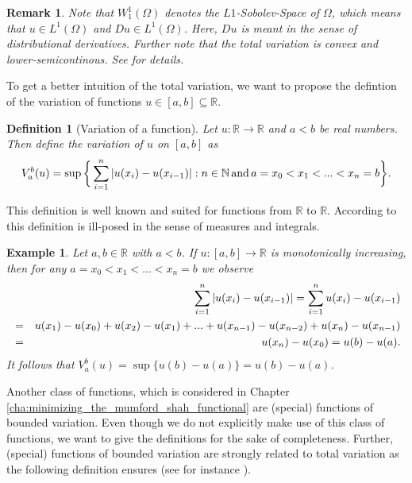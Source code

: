 \documentclass[abstracton]{scrreprt}
\newtheorem{definition}[theorem]{Definition}
\newtheorem{example}[theorem]{Example}
\newtheorem{remark}[theorem]{Remark}
\begin{document}
        \begin{remark}
            Note that $W_{1}^{1}(\Omega)$ denotes the $L1$-Sobolev-Space of $\Omega$, which means that $u \in L^{1}(\Omega)$ and $Du \in L^{1}(\Omega)$. Here, $Du$ is meant in the sense of distributional derivatives. Further note that the total variation is convex and lower-semicontinous. See \cite{Chambolle-et-al-10} for details.
        \end{remark}
        To get a better intuition of the total variation, we want to propose the defintion of the variation of functions $u \in [a, b] \subseteq \mathbb{R}$.
        \begin{definition}[Variation of a function] %
        \label{def:variation_of_a_function}
            Let $u: \mathbb{R} \longrightarrow \mathbb{R}$ and $a < b$ be real numbers. Then define the variation of $u$ on $[a, b]$ as
                $$
                    V^{b}_{a}(u) = \sup \bigg\{ \sum_{i = 1}^{n} |u(x_{i}) - u(x_{i - 1})| : n \in \mathbb{N} \,\textnormal{and}\, a = x_{0} < x_{1} < ... < x_{n} = b \bigg\}.
                $$
        \end{definition}
        This definition is well known and suited for functions from $\mathbb{R}$ to $\mathbb{R}$. According to \cite{Giusti} this definition is ill-posed in the sense of measures and integrals.
        \begin{example} %
        \label{ex:total_variation_one_d}
            Let $a, b \in \mathbb{R}$ with $a < b$. If $u: [a, b] \longrightarrow \mathbb{R}$ is monotonically increasing, then for any $a = x_{0} < x_{1} < ... < x_{n} = b$ we observe
                \begin{eqnarray}
                    &&\sum_{i = 1}^{n} |u(x_{i}) - u(x_{i-1})| = \sum_{i = 1}^{n} u(x_{i}) - u(x_{i-1}) \notag \\
                    &=& u(x_{1}) - u(x_{0}) + u(x_{2}) - u(x_{1}) + ... + u(x_{n-1}) - u(x_{n-2}) + u(x_{n}) - u(x_{n-1}) \notag \\
                    &=& u(x_{n}) - u(x_{0}) = u(b) - u(a). \notag
                \end{eqnarray}
            It follows that $V^{b}_{a}(u) = \sup \{u(b) - u(a)\} = u(b) - u(a)$.
        \end{example}
        Another class of functions, which is considered in Chapter \ref{cha:minimizing_the_mumford_shah_functional}
        are (special) functions of bounded variation. Even though we do not explicitly make use of this class of functions, we want to give the definitions for the sake of completeness. Further, (special) functions of bounded variation are strongly related to total variation as the following definition ensures (see for instance \cite{Giusti}).
\end{document}
